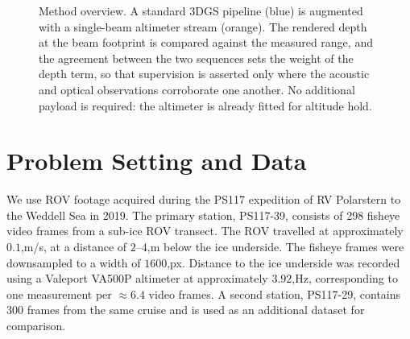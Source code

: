 \documentclass[conference]{IEEEtran}
\begin{document}
\begin{figure}[t]
\caption{Method overview. A standard 3DGS pipeline (blue) is augmented with a
single-beam altimeter stream (orange). The rendered depth at the beam
footprint is compared against the measured range, and the agreement between the
two sequences sets the weight of the depth term, so that supervision is
asserted only where the acoustic and optical observations corroborate one
another. No additional payload is required: the altimeter is already fitted for
altitude hold.}
\label{fig:pipeline}
\end{figure}

\section{Problem Setting and Data}
\label{sec:data}

We use ROV footage acquired during the PS117 expedition \cite{meiners2019polarstern} of RV Polarstern to the Weddell Sea in 2019. The primary station, PS117-39, consists of 298 fisheye video frames from a sub-ice ROV transect. The ROV travelled at approximately $0.1$,m/s, at a distance of $2$--$4$,m below the ice underside. The fisheye frames were downsampled to a width of $1600$,px. Distance to the ice underside was recorded using a Valeport VA500P altimeter at approximately $3.92$,Hz, corresponding to one measurement per $\approx 6.4$ video frames. A second station, PS117-29, contains 300 frames from the same cruise and is used as an additional dataset for comparison.
\end{document}
